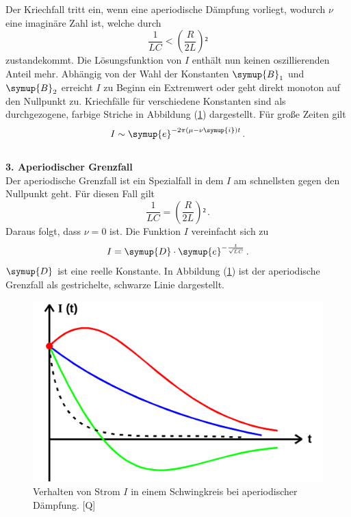 Der Kriechfall tritt ein, wenn eine aperiodische Dämpfung vorliegt, wodurch
 $\nu$ eine imaginäre Zahl ist, welche durch 
\begin{equation*}
    \frac{1}{LC} < \left(\frac{R}{2L}\right)² 
\end{equation*}
zustandekommt. Die Lösungsfunktion von $I$ enthält nun keinen oszillierenden Anteil mehr. 
Abhängig von der Wahl der Konstanten $\symup{B}_1$ und $\symup{B}_2$ erreicht $I$ zu Beginn ein Extremwert 
oder geht direkt monoton auf den Nullpunkt zu. Kriechfälle für verschiedene Konstanten 
sind als durchgezogene, farbige Striche in Abbildung (\ref{pic:aperiodische_Daempfung})
dargestellt. 
Für große Zeiten gilt
\begin{equation*}
    I \sim \symup{e}^{- 2\pi \left(\mu - \nu \symup{i}\right)t}\, . 
\end{equation*}
 \\
\textbf{3. Aperiodischer Grenzfall}\\
Der aperiodische Grenzfall ist ein Spezialfall in dem $I$ am schnellsten gegen den 
Nullpunkt geht. 
Für diesen Fall gilt 
\begin{equation*}
    \frac{1}{LC} = \left(\frac{R}{2L}\right)² \, .
\end{equation*}
Daraus folgt, dass $\nu = 0$ ist. Die Funktion $I$ vereinfacht sich zu
\begin{equation*}
    I = \symup{D} \cdot \symup{e}^{- \frac{t}{\sqrt{L C}}} \, .
\end{equation*} 
$\symup{D}$ ist eine reelle Konstante. In Abbildung (\ref{pic:aperiodische_Daempfung})
ist der aperiodische Grenzfall als gestrichelte, schwarze Linie dargestellt. 

\begin{figure}[H]
    \centering
    \includegraphics[width=0.7\linewidth]{Aperiodische_Daempfung_Abbildung.png}
    \caption{Verhalten von Strom $I$ in einem Schwingkreis bei aperiodischer Dämpfung. [Q\cite{anleitungV354}]}
    \label{pic:aperiodische_Daempfung}
\end{figure}

